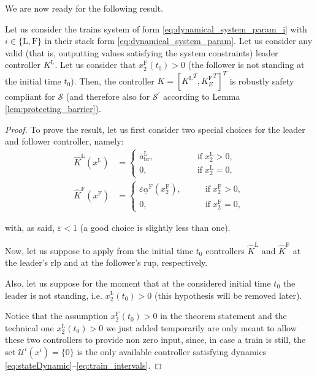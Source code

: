 We are now ready for the following result. 
\begin{theorem}\label{thm:trains_barrier}
	Let us consider the trains system of form \eqref{eq:dynamical_system_param_i} with $i\in\{\mathrm{L},\mathrm{F}\}$ in their stack form \eqref{eq:dynamical_system_param}. 
	Let us consider any valid (that is, outputting values satisfying the system constraints) leader controller $K^\mathrm{L}$. Let us consider that $x_2^\mathrm{F}(t_0)>0$ (the follower is not standing at the initial time $t_0$).
	Then, the controller $K=[{K^\mathrm{L}}^T, {K^\mathrm{F}_E}^T]^T$ is robustly safety compliant for $\mathcal{S}$ (and therefore also for $\mathcal{S}^\prime$ according to Lemma \ref{lem:protecting_barrier}).
	
	\begin{proof}
		To prove the result, let us first consider two special choices for the leader and follower controller, namely: 
		\begin{align*}
			\hat{K}^\mathrm{L}(x^\mathrm{L}) &= 
			\begin{cases}
				\overline{a}^\mathrm{L}_{\mathrm{br}}, &\qquad \qquad \; \text{if} \; x_2^\mathrm{L} > 0, \\
				0, &\qquad \qquad \; \text{if} \; x_2^\mathrm{L} = 0,
			\end{cases} \\
			\hat{K}^\mathrm{F}(x^\mathrm{F}) &= 
			\begin{cases}
				\varepsilon \underline{\alpha}^\mathrm{F}(x_2^\mathrm{F}), &\qquad \text{if} \; x_2^\mathrm{F} > 0, \\
				0, &\qquad \text{if} \; x_2^\mathrm{F} = 0,
			\end{cases}
		\end{align*}
		
		with, as said, $\varepsilon<1$ (a good choice is slightly less than one). 
		
		
		
		
		Now, let us suppose to apply from the initial time $t_0$ controllers $\hat{K}^\mathrm{L}$  and  $\hat{K}^\mathrm{F}$ at the leader's \gls{rlp} and at the follower's \gls{rup}, respectively. 
		
		
		Also, let us suppose for the moment that at the considered initial time $t_0$ the leader is not standing, i.e. $x_2^\mathrm{L}(t_0)>0$ (this hypothesis will be removed later).
		
		Notice that the assumption $x_2^\mathrm{F}(t_0)>0$ in the theorem statement  and the technical one $x_2^\mathrm{L}(t_0)>0$ we just added temporarily are only meant to allow these two controllers to provide non zero input, since, in case a train is still, the set $\mathcal{U}^i (x^i) = \{0\}$ is the only available controller satisfying dynamics  \eqref{eq:stateDynamic}–\eqref{eq:train_intervals}.
		

\end{proof}
\end{theorem}
